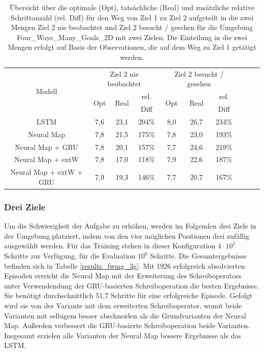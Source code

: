 \begin{table}
  \begin{tabular}{|c|c|c|c|c|c|c|c|c|c|}
    \hline
    \multirow{3}{*}{Modell} & \multicolumn{3}{|c|}{Ziel 2 nie beobachtet} & \multicolumn{3}{|c|}{Ziel 2 besucht / gesehen} \\ \cline{2-7}
    & \multirow{2}{*}{Opt} & \multirow{2}{*}{Real} & rel. & \multirow{2}{*}{Opt} & \multirow{2}{*}{Real} & rel. \\
    & & & Diff & & & Diff \\ \hline
    LSTM & 7,6 & 23,1 & 204\% & 8,0 & 26,7 & 234\% \\ \hline
    Neural Map & 7,8 & 21,5 & 175\% & 7,8 & 23,0 & 193\% \\ \hline
    Neural Map + GRU & 7,8 & 20,1 & 157\% & 7,7 & 24,6 & 219\% \\ \hline
    Neural Map + extW & 7,8 & 17,0 & 118\% & 7,9 & 22,6 & 187\% \\ \hline
    Neural Map + extW + GRU & 7,9 & 19,3 & 146\% & 7,7 & 20,7 & 167\% \\ \hline
  \end{tabular}
  \caption{Übersicht über die optimale (Opt), tatsächliche (Real) und zusätzliche relative Schrittanzahl (rel. Diff) für den Weg von Ziel 1 zu Ziel 2 aufgeteilt in die zwei Mengen \glqq Ziel 2 nie beobachtet\grqq{} und \glqq Ziel 2 besucht / gesehen\grqq{} für die Umgebung \glqq Four\_Ways\_Many\_Goals\_2D\grqq{} mit zwei Zielen. Die Einteilung in die zwei Mengen erfolgt auf Basis der Observationen, die auf dem Weg zu Ziel 1 getätigt werden.}
  \label{results_fw2g_1_to_2_per_M}
\end{table}


\subsubsection{Drei Ziele}

Um die Schwierigkeit der Aufgabe zu erhöhen, werden im Folgenden drei Ziele in der Umgebung platziert, indem von den vier möglichen Positionen drei zufällig ausgewählt werden. Für das Training stehen in dieser Konfiguration $4\cdot10^5$ Schritte zur Verfügung, für die Evaluation $10^6$ Schritte. Die Gesamtergebnisse befinden sich in Tabelle \ref{results_fwmg_3g}. Mit 1926 erfolgreich absolvierten Episoden erreicht die Neural Map mit der Erweiterung des Schreiboperators unter Verwendendung der GRU-basierten Schreiboperation die besten Ergebnisse. Sie benötigt durchschnittlich 51,7 Schritte für eine erfolgreiche Episode. Gefolgt wird sie von der Variante mit dem erweiterten Schreiboperator, womit beide Varianten mit selbigem besser abschneiden als die Grundvarianten der Neural Map. Außerden verbessert die GRU-basierte Schreiboperation beide Varianten. Insgesamt erzielen alle Varianten der Neural Map bessere Ergebnisse als das LSTM.

